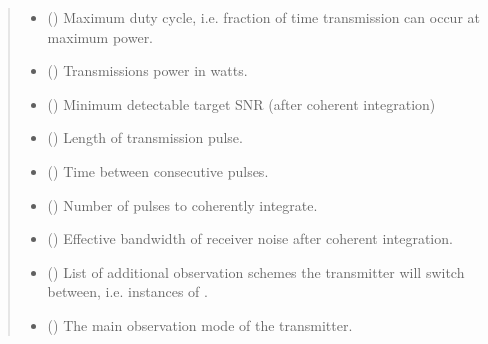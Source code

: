 \documentclass[letterpaper,10pt,english]{sphinxmanual}
\begin{document}
\begin{fulllineitems}
\begin{quote}
\begin{description}
\begin{itemize}
\item {} 
 () \textendash{} Maximum duty cycle, i.e. fraction of time transmission can occur at maximum power.

\item {} 
 () \textendash{} Transmissions power in watts.

\item {} 
 () \textendash{} Minimum detectable target SNR (after coherent integration)

\item {} 
 () \textendash{} Length of transmission pulse.

\item {} 
 () \textendash{} Time between consecutive pulses.

\item {} 
 () \textendash{} Number of pulses to coherently integrate.

\item {} 
 () \textendash{} Effective bandwidth of receiver noise after coherent integration.

\item {} 
 () \textendash{} List of additional observation schemes the transmitter will switch between, i.e. instances of .

\item {} 
 () \textendash{} The main observation mode of the transmitter.


\end{itemize}
\end{description}
\end{quote}
\end{fulllineitems}
\end{document}
